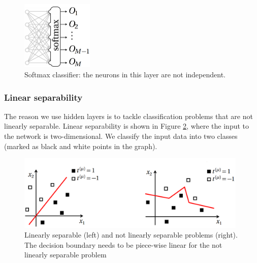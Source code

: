 \vspace{3mm}
\begin{figure}[htb]
	\begin{center}
		\includegraphics*[width=3.4cm, keepaspectratio]{obr/softmax.png}
	\end{center}
	\vspace{3mm}
	\caption{Softmax classifier: the neurons in this layer are
		not independent. \cite{mehlig}} 
	\label{softmax}
\end{figure}

\subsubsection{Linear separability}

The reason we use hidden layers is to tackle classification problems that are not linearly separable. Linear separability is shown in Figure \ref{separability}, where the input to the network is two-dimensional. We classify the input data into two classes (marked as black and white points in the graph). \cite{mehlig}

\begin{figure}[htb]
	\begin{center}
		\includegraphics*[width=11cm, keepaspectratio]{obr/separability.png}
	\end{center}
	\vspace{3mm}
	\caption{Linearly separable (left) and not linearly separable problems (right). The decision boundary needs to be piece-wise linear for the not linearly separable problem \cite{mehlig}} 
	\label{separability}
\end{figure}

